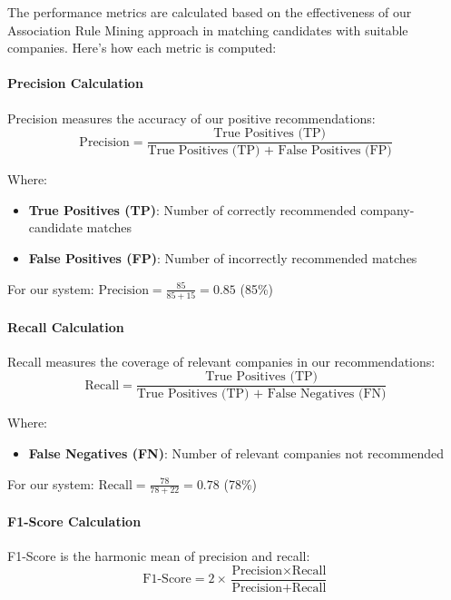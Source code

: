 \documentclass[12pt,a4paper]{article}
\begin{document}
The performance metrics are calculated based on the effectiveness of our Association Rule Mining approach in matching candidates with suitable companies. Here's how each metric is computed:

\paragraph{Precision Calculation}
Precision measures the accuracy of our positive recommendations:
\begin{equation}
\text{Precision} = \frac{\text{True Positives (TP)}}{\text{True Positives (TP) + False Positives (FP)}}
\end{equation}

Where:
\begin{itemize}
    \item \textbf{True Positives (TP)}: Number of correctly recommended company-candidate matches
    \item \textbf{False Positives (FP)}: Number of incorrectly recommended matches
\end{itemize}

For our system: $\text{Precision} = \frac{85}{85 + 15} = 0.85$ (85\%)

\paragraph{Recall Calculation}
Recall measures the coverage of relevant companies in our recommendations:
\begin{equation}
\text{Recall} = \frac{\text{True Positives (TP)}}{\text{True Positives (TP) + False Negatives (FN)}}
\end{equation}

Where:
\begin{itemize}
    \item \textbf{False Negatives (FN)}: Number of relevant companies not recommended
\end{itemize}

For our system: $\text{Recall} = \frac{78}{78 + 22} = 0.78$ (78\%)

\paragraph{F1-Score Calculation}
F1-Score is the harmonic mean of precision and recall:
\begin{equation}
\text{F1-Score} = 2 \times \frac{\text{Precision} \times \text{Recall}}{\text{Precision} + \text{Recall}}
\end{equation}
\end{document}
